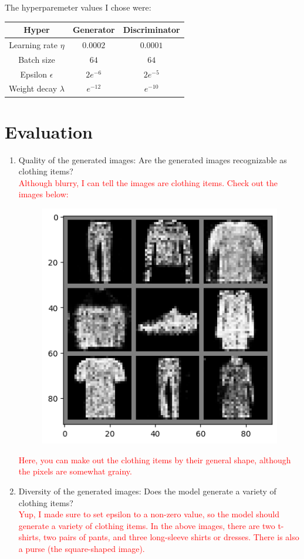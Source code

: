 \documentclass{genai}
\begin{document}
The hyperparemeter values I chose were:\\
\begin{tabular}{c|c|c}
	\textbf{Hyper} & \textbf{Generator} & \textbf{Discriminator} \\
	\hline
	Learning rate $\eta$ & $0.0002$ & $0.0001$\\
	Batch size & $64$ & $64$\\
	Epsilon $\epsilon$ & $2e^{-6}$ & $2e^{-5}$\\
	Weight decay $\lambda$ & $e^{-12}$ & $e^{-10}$
\end{tabular}

\section{Evaluation}

\begin{enumerate}

	\item Quality of the generated images: Are the generated images recognizable as clothing items?\\
	\textcolor{red}{Although blurry, I can tell the images are clothing items. Check out the images below: }

	\begin{figure}[h]
		\includegraphics[width=.5\textwidth]{example_images.png}	
	\end{figure}

	\textcolor{red}{Here, you can make out the clothing items by their general shape, although the pixels are somewhat grainy.}

	\item Diversity of the generated images: Does the model generate a variety of clothing items?\\
	\textcolor{red}{ Yup, I made sure to set epsilon to a non-zero value, so the model should generate a variety of clothing items.
		In the above images, there are two t-shirts, two pairs of pants, and three long-sleeve shirts or dresses.
		There is also a purse (the square-shaped image).
	}


\end{enumerate}
\end{document}
